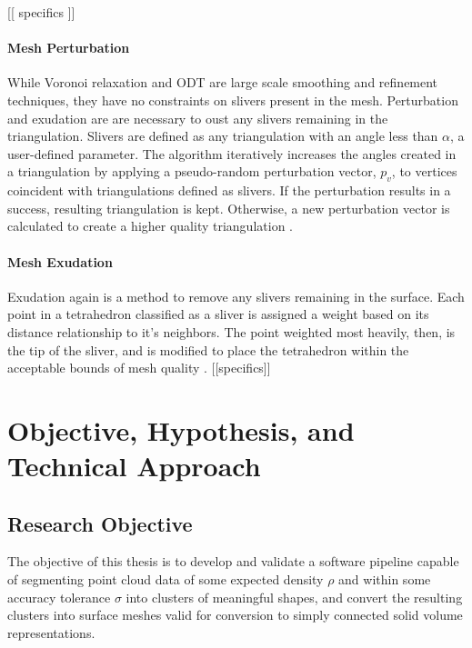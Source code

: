 \documentclass[12pt]{drexelthesis}
\let\Oldsection\section
\renewcommand{\section}{\FloatBarrier\Oldsection}
\let\Oldsubsubsection\subsubsection
\renewcommand{\subsubsection}{\FloatBarrier\Oldsubsubsection}
\begin{document}
[[ specifics ]]

\subsubsection{Mesh Perturbation}
While  Voronoi  relaxation  and  ODT  are  large  scale  smoothing  and  refinement  techniques,  they  have  no  constraints  on  slivers  present  in  the  mesh.  Perturbation  and  exudation  are  are  necessary  to  oust  any  slivers  remaining  in  the  triangulation.  Slivers  are  defined  as  any  triangulation  with  an  angle  less  than  $\alpha$,  a  user-defined  parameter.  The  algorithm  iteratively  increases  the  angles  created  in  a  triangulation  by  applying  a  pseudo-random  perturbation  vector,  $p_{v}$,  to  vertices  coincident  with  triangulations  defined  as  slivers.  If  the  perturbation  results  in  a  success,  resulting  triangulation  is  kept.  Otherwise,  a  new  perturbation  vector  is  calculated  to  create  a  higher  quality  triangulation  \cite{RN63}. 

\subsubsection{Mesh Exudation}
Exudation  again  is  a  method  to  remove  any  slivers  remaining  in  the  surface.  Each  point  in  a  tetrahedron  classified  as  a  sliver  is  assigned  a  weight  based  on  its distance  relationship  to  it’s  neighbors.  The  point  weighted  most  heavily,  then,  is  the  tip  of  the  sliver,  and  is  modified  to  place  the  tetrahedron  within  the  acceptable  bounds  of  mesh  quality  \cite{RN64}. [[specifics]]















\chapter{Objective, Hypothesis, and Technical Approach}
\label{chap:purposestatement}

\section{Research Objective}
The objective of this thesis is to develop and validate a software pipeline capable of segmenting point cloud data of some expected density $\rho$ and within some accuracy tolerance $\sigma$ into clusters of meaningful shapes, and convert the resulting clusters into surface meshes valid for conversion to simply connected solid volume representations.
\end{document}
